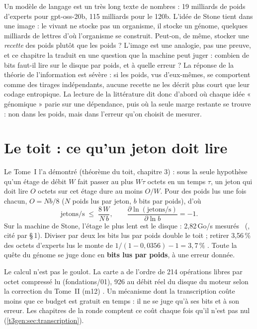 \begin{enbref}
Un modèle de langage est un très long texte de nombres : 19 milliards de poids d'experts pour gpt-oss-20b, 115 milliards pour le 120b. L'idée de Stone tient dans une image : le vivant ne stocke pas un organisme, il stocke un génome, quelques milliards de lettres d'où l'organisme se construit. Peut-on, de même, stocker une \emph{recette} des poids plutôt que les poids ? L'image est une analogie, pas une preuve, et ce chapitre la traduit en une question que la machine peut juger : combien de bits faut-il lire sur le disque par poids, et à quelle erreur ? La réponse de la théorie de l'information est sévère : si les poids, vus d'eux-mêmes, se comportent comme des tirages indépendants, aucune recette ne les décrit plus court que leur codage entropique. La lecture de la littérature dit donc d'abord où chaque idée « génomique » parie sur une dépendance, puis où la seule marge restante se trouve : non dans les poids, mais dans l'erreur qu'on choisit de mesurer.
\end{enbref}

\section{Le toit : ce qu'un jeton doit lire}\label{t3que:sec:toit}

Le Tome~I l'a démontré (théorème du toit, chapitre 3) : sous la seule hypothèse qu'un étage de débit $W$ fait passer au plus $W\tau$ octets en un temps $\tau$, un jeton qui doit lire $O$ octets sur cet étage dure au moins $O/W$. Pour des poids lus une fois chacun, $O = N b / 8$ ($N$ poids lus par jeton, $b$ bits par poids), d'où
\begin{equation}\label{t3que:eq:toit}
\text{jetons/s} \;\le\; \frac{8\,W}{N\,b}, \qquad \frac{\partial \ln(\text{jetons/s})}{\partial \ln b} = -1 .
\end{equation}
Sur la machine de Stone, l'étage le plus lent est le disque : 2,82\,Go/s mesurés \mes~(, cité par  §\,1). Diviser par deux les bits lus par poids double le toit ; retirer 3,56\,\% des octets d'experts lus le monte de $1/(1 - 0{,}0356) - 1 = 3{,}7\,\%$ \calc. Toute la quête du génome se juge donc en \textbf{bits lus par poids}, à une erreur donnée.

Le calcul n'est pas le goulot. La carte a de l'ordre de 214 opérations libres par octet compressé lu (fondations/01), 926 au débit réel du disque du moteur selon la correction du Tome~II (m12) \calc. Un mécanisme dont la transcription coûte moins que ce budget est gratuit en temps : il ne se juge qu'à ses bits et à son erreur. Les chapitres de la ronde comptent ce coût chaque fois qu'il n'est pas nul (\cref{t3gen:sec:transcription}).

